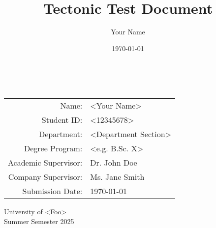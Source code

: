 \documentclass[a4paper,12pt]{report}
\title{Tectonic Test Document}
\author{Your Name}
\date{\today}
\begin{document}
\begin{titlepage}
    \begin{center}
        \vspace*{2cm}
        {\Large\bfseries <Academic Writing Title>}\\[2cm]

        \begin{tabular}{rl}
            Name:                 & <Your Name> \\
            Student ID:           & <12345678> \\
            Department:           & <Department Section> \\
            Degree Program:       & <e.g. B.Sc. X> \\
            Academic Supervisor:  & Dr. John Doe \\
            Company Supervisor:   & Ms. Jane Smith \\
            Submission Date:      & \today \\
        \end{tabular}
        \vfill

        University of <Foo>\\
        Summer Semester 2025
    \end{center}
\end{titlepage}

\cleardoublepage
\tableofcontents
\clearpage




\printbibliography
\end{document}
